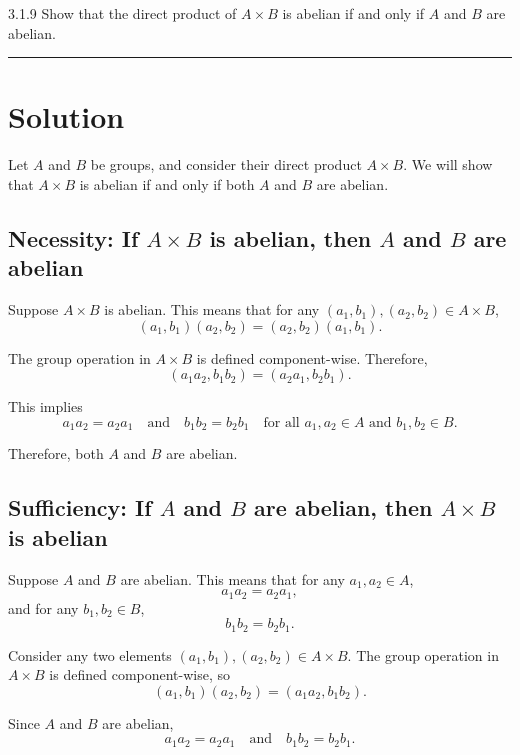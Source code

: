 \documentclass[12pt]{amsart}
\theoremstyle{definition}
\numberwithin{equation}{section}
\begin{document}
\begin{exercise}{3.1.9} Show that the direct product of \(A\times B\) is abelian if and only if $A$ and $B$ are abelian.
    
    \noindent\rule{\linewidth}{1pt}

    \section*{Solution}

    Let \(A\) and \(B\) be groups, and consider their direct product \(A \times B\). We will show that \(A \times B\) is abelian if and only if both \(A\) and \(B\) are abelian.

    \subsection*{Necessity: If \(A \times B\) is abelian, then \(A\) and \(B\) are abelian}

    Suppose \(A \times B\) is abelian. This means that for any \((a_1, b_1), (a_2, b_2) \in A \times B\),
    \[
    (a_1, b_1) (a_2, b_2) = (a_2, b_2) (a_1, b_1).
    \]

    The group operation in \(A \times B\) is defined component-wise. Therefore,
    \[
    (a_1 a_2, b_1 b_2) = (a_2 a_1, b_2 b_1).
    \]

    This implies
    \[
    a_1 a_2 = a_2 a_1 \quad \text{and} \quad b_1 b_2 = b_2 b_1 \quad \text{for all } a_1, a_2 \in A \text{ and } b_1, b_2 \in B.
    \]

    Therefore, both \(A\) and \(B\) are abelian.

    \subsection*{Sufficiency: If \(A\) and \(B\) are abelian, then \(A \times B\) is abelian}

    Suppose \(A\) and \(B\) are abelian. This means that for any \(a_1, a_2 \in A\),
    \[
    a_1 a_2 = a_2 a_1,
    \]
    and for any \(b_1, b_2 \in B\),
    \[
    b_1 b_2 = b_2 b_1.
    \]

    Consider any two elements \((a_1, b_1), (a_2, b_2) \in A \times B\). The group operation in \(A \times B\) is defined component-wise, so
    \[
    (a_1, b_1) (a_2, b_2) = (a_1 a_2, b_1 b_2).
    \]

    Since \(A\) and \(B\) are abelian,
    \[
    a_1 a_2 = a_2 a_1 \quad \text{and} \quad b_1 b_2 = b_2 b_1.
    \]


\end{exercise}
\end{document}
